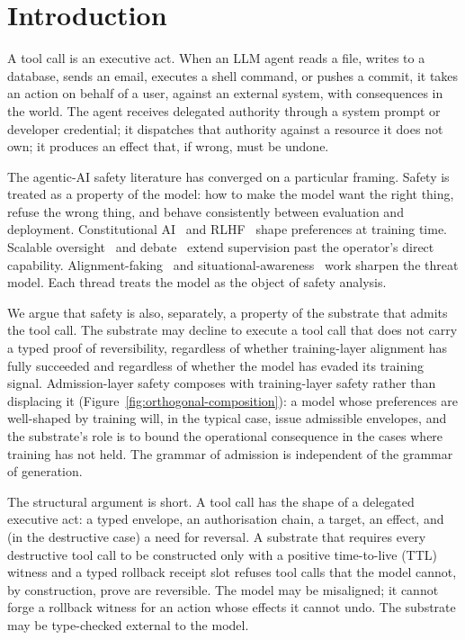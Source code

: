 \section{Introduction}
\label{sec:intro}

A tool call is an executive act. When an LLM agent reads a file, writes to a database, sends an email, executes a shell command, or pushes a commit, it takes an action on behalf of a user, against an external system, with consequences in the world. The agent receives delegated authority through a system prompt or developer credential; it dispatches that authority against a resource it does not own; it produces an effect that, if wrong, must be undone.

The agentic-AI safety literature has converged on a particular framing. Safety is treated as a property of the model: how to make the model want the right thing, refuse the wrong thing, and behave consistently between evaluation and deployment. Constitutional AI~\cite{baiConstitutionalAI2022} and RLHF~\cite{ouyangRLHF2022} shape preferences at training time. Scalable oversight~\cite{leikeScalableOversight2018,bowmanScalableOversight2022} and debate~\cite{christianoDebate2018} extend supervision past the operator's direct capability. Alignment-faking~\cite{hubingerAlignmentFaking2024} and situational-awareness~\cite{berglundSituationalAwareness2023} work sharpen the threat model. Each thread treats the model as the object of safety analysis.

We argue that safety is also, separately, a property of the substrate that admits the tool call. The substrate may decline to execute a tool call that does not carry a typed proof of reversibility, regardless of whether training-layer alignment has fully succeeded and regardless of whether the model has evaded its training signal. Admission-layer safety composes with training-layer safety rather than displacing it (Figure~\ref{fig:orthogonal-composition}): a model whose preferences are well-shaped by training will, in the typical case, issue admissible envelopes, and the substrate's role is to bound the operational consequence in the cases where training has not held. The grammar of admission is independent of the grammar of generation.

The structural argument is short. A tool call has the shape of a delegated executive act: a typed envelope, an authorisation chain, a target, an effect, and (in the destructive case) a need for reversal. A substrate that requires every destructive tool call to be constructed only with a positive time-to-live (TTL) witness and a typed rollback receipt slot refuses tool calls that the model cannot, by construction, prove are reversible. The model may be misaligned; it cannot forge a rollback witness for an action whose effects it cannot undo. The substrate may be type-checked external to the model.

